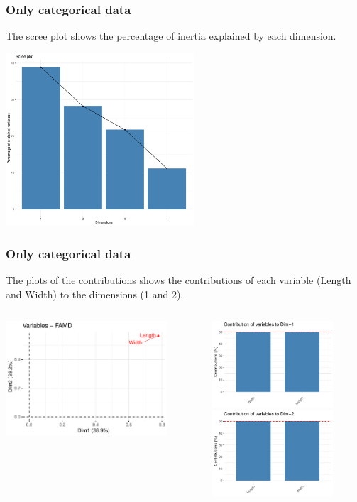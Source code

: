 \begin{frame}
\frametitle{Only categorical data}
The scree plot shows the percentage of inertia explained by each dimension.
\begin{center}
\includegraphics[width=7cm]{../../Graphs/FAMD_screeplot.png}
\end{center}
\end{frame}
\begin{frame}
\frametitle{Only categorical data}
\small
The plots of the contributions shows the contributions of each variable (Length and Width) to the dimensions (1 and 2).
\normalsize
\begin{columns}
\begin{column}{0.55\textwidth}
\includegraphics[width=6cm]{../../Graphs/FAMD_contrib_xy.png}
\end{column}
\begin{column}{0.45\textwidth}
\includegraphics[width=4.5cm]{../../Graphs/FAMD_contrib_x.png}\\
\includegraphics[width=4.5cm]{../../Graphs/FAMD_contrib_y.png}
\end{column}
\end{columns}
\end{frame}
